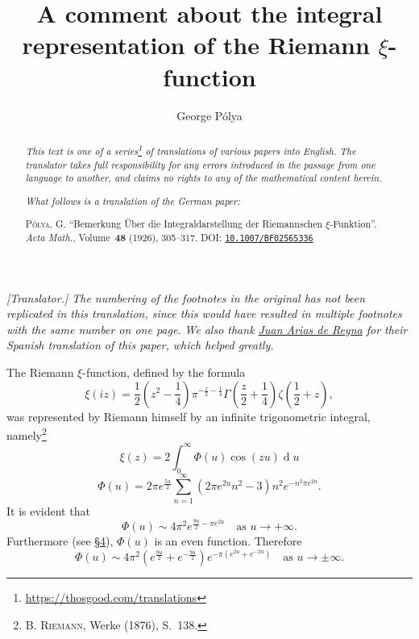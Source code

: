 \documentclass{article}
\title{A comment about the integral representation of the Riemann $\xi$-function}
\author{George P\'{o}lya}
\date{}
\newcommand{\doctype}{German paper}
\newcommand{\origcit}{%
  \textsc{P\'{o}lya, G.}
  ``Bemerkung \"{U}ber die Integraldarstellung der Riemannschen $\xi$-Funktion''.
  \emph{Acta Math.}, Volume~\textbf{48} (1926), 305--317.
  DOI: \href{https://doi.org/10.1007/BF02565336}{\texttt{10.1007/BF02565336}}%
}
\theoremstyle{plain}
\newcommand{\dd}{\operatorname{d}\!}
\newcommand{\oldpage}[1]{\marginpar{\footnotesize$\Big\vert$ \textit{p.~#1}}}
\begin{document}
\maketitle
\thispagestyle{fancy}

\renewcommand{\abstractname}{Translator's note.}

\begin{abstract}
  \renewcommand*{\thefootnote}{\fnsymbol{footnote}}
  \emph{This text is one of a series\footnote{\url{https://thosgood.com/translations}} of translations of various papers into English.}
  \emph{The translator takes full responsibility for any errors introduced in the passage from one language to another, and claims no rights to any of the mathematical content herein.}

  \medskip
  
  \emph{What follows is a translation of the \doctype:}

  \medskip\noindent
  \origcit
\end{abstract}

\setcounter{footnote}{0}

\bigskip



\emph{[Translator.] The numbering of the footnotes in the original has not been replicated in this translation, since this would have resulted in multiple footnotes with the same number on one page.}
\emph{We also thank \href{https://personal.us.es/arias/}{Juan Arias de Reyna} for their Spanish translation of this paper, which helped greatly.}

\bigskip

The Riemann $\xi$-function, defined by the formula
\oldpage{305}
\[
\label{1}
  \xi(iz)
  =
  \frac12 \left(
    z^2 - \frac14
  \right) \pi^{-\frac{z}{2}-\frac14} \Gamma \left(
    \frac{z}{2} + \frac14
  \right) \zeta \left(
    \frac12 + z
  \right),
\tag{1}
\]
was represented by Riemann himself by an infinite trigonometric integral, namely\footnote{\textsc{B. Riemann}, Werke (1876), S.~138.}
\[
\label{2}
  \xi(z) = 2\int_0^\infty \Phi(u)\cos(zu)\dd u
\tag{2}
\]
\[
\label{3}
  \Phi(u) = 2\pi e^{\frac{5u}{2}} \sum_{n=1}^\infty (2\pi e^{2u}n^2 - 3) n^2 e^{-n^2\pi e^{2u}}.
\tag{3}
\]
It is evident that
\[
\label{4}
  \Phi(u) \sim 4\pi^2 e^{\frac{9u}{2}-\pi e^{2u}}
  \quad\mbox{as $u\to+\infty$.}
\tag{4}
\]
Furthermore (see \hyperref[section4]{\S4}), $\Phi(u)$ is an even function.
Therefore
\[
\label{5}
  \Phi(u) \sim 4\pi^2 \left(
    e^{\frac{9u}{2}} + e^{-\frac{9u}{2}}
  \right) e^{-\pi(e^{2u}+e^{-2u})}
  \quad\mbox{as $u\to\pm\infty$.}
\tag{5}
\]
\end{document}
